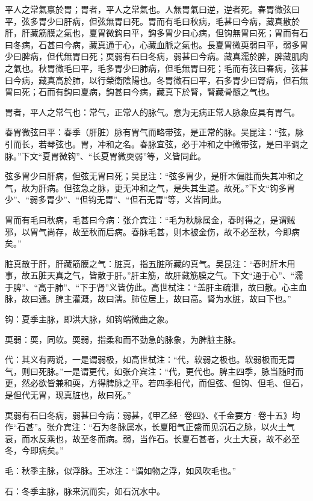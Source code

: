 \documentclass[12pt]{ctexbook}
\begin{document}

\begin{yuanwen}
平人之常氣禀於胃；胃者，平人之常氣也。人無胃氣曰逆，逆者死。春胃微弦曰平，弦多胃少曰肝病，但弦無胃曰死。胃而有毛曰秋病，毛甚曰今病，藏真散於肝，肝藏筋膜之氣也，夏胃微鈎曰平，鈎多胃少曰心病，但钩無胃曰死；胃而有石曰冬病，石甚曰今病，藏真通于心，心藏血脈之氣也。長夏胃微耎弱曰平，弱多胃少曰脾病，但代無胃曰死；耎弱有石曰冬病，弱甚曰今病。藏真濡於脾，脾藏肌肉之氣也。秋胃微毛曰平，毛多胃少曰肺病，但毛無胃曰死；毛而有弦曰春病，弦甚曰今病，藏真高於肺，以行榮衛陰陽也。冬胃微石曰平，石多胃少曰腎病，但石無胃曰死；石而有鈎曰夏病，鈎甚曰今病，藏真下於腎，腎藏骨髓之气也。
\end{yuanwen}


\begin{jiaozhu}
  \item 胃者，平人之常气也：常气，正常人的脉气。意为无病正常人脉象应具有胃气。
  \item 春胃微弦曰平：春季（肝脏）脉有胃气而略带弦，是正常的脉。吴昆注：“弦，脉引而长，若琴弦也。胃，冲和之名。春脉宜弦，必于冲和之中微带弦，是曰平调之脉。”下文“夏胃微钩”、“长夏胃微耎弱”等，义皆同此。
  \item 弦多胃少曰肝病，但弦无胃曰死；吴昆注：“弦多胃少，是肝木偏胜而失其冲和之气，故为肝病。但弦急之脉，更无冲和之气，是失其生道。故死。”下文“钩多胃少”、“弱多胃少”、“但钩无胃”、“但石无胃”等，义皆同此。
  \item 胃而有毛曰秋病，毛甚曰今病：张介宾注：“毛为秋脉属金，春时得之，是谓贼邪，以胃气尚存，故至秋而后病。春脉毛甚，则木被金伤，故不必至秋，今即病矣。”
  \item 脏真散于肝，肝藏筋膜之气：脏真，指五脏所藏的真气。吴昆注：“春时肝木用事，故五脏天真之气，皆散于肝。”肝主筋，故肝藏筋膜之气。下文“通于心”、“濡于脾”、“高于肺”、“下于肾”义皆仿此。高世栻注：“盖肝主疏泄，故曰散。心主血脉，故曰通。脾主灌溉，故曰濡。肺位居上，故曰高。肾为水脏，故曰下也。”
  \item 钩：夏季主脉，即洪大脉，如钩端微曲之象。
  \item 耎弱：耎，同软。耎弱，指柔和而不劲急的脉象，为脾脏主脉。
  \item 代：其义有两说，一是谓弱极，如高世栻注：“代，软弱之极也。软弱极而无胃气，则曰死脉。”一是谓更代，如张介宾注：“代，更代也。脾主四季，脉当随时而更，然必欲皆兼和耎，方得脾脉之平。若四季相代，而但弦、但钩、但毛、但石，是但代无胃，现真脏也，故曰死。”
  \item 耎弱有石曰冬病，弱甚曰今病：弱甚，《甲乙经·卷四》、《千金要方·卷十五》均作“石甚”。张介宾注：“石为冬脉属水，长夏阳气正盛而见沉石之脉，以火土气衰，而水反乘也，故至冬而病。弱，当作石。长夏石甚者，火土大衰，故不必至冬，今即病矣。”
  \item 毛：秋季主脉，似浮脉。王冰注：“谓如物之浮，如风吹毛也。”
  \item 石：冬季主脉，脉来沉而实，如石沉水中。
\end{jiaozhu}
\end{document}
